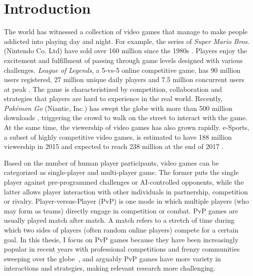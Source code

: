 
\chapter{Introduction} %

\label{chapter:intro} %

The world has witnessed a collection of video games that manage to make people addicted into playing day and night. For example, the series of \textit{Super Mario Bros.} (Nintendo Co. Ltd) have sold over 160 million since the 1980s \cite{mariosale}. Players enjoy the excitement and fulfillment of passing through game levels designed with various challenges. \textit{League of Legends}, a 5-vs-5 online competitive game, has 90 million users registered, 27 million unique daily players and 7.5 million concurrent users at peak \cite{lol_fanbase,lol_27million}. The game is characteristized by competition, collaboration and strategies that players are hard to experience in the real world. Recently, \textit{Pok\'{e}mon Go} (Niantic, Inc.) has swept the globe with more than 500 million downloads \cite{pokemongo}, triggering the crowd to walk on the street to interact with the game. At the same time, the viewership of video games has also grown rapidly. e-Sports, a subset of highly competitive video games, is estimated to have 188 million viewership in 2015 and expected to reach 238 million at the end of 2017 \cite{superdata}. 

Based on the number of human player participants, video games can be categorized as single-player and multi-player game. The former puts the single player against pre-programmed challenges or AI-controlled opponents, while the latter allows player interaction with other individuals in partnership, competition or rivalry. Player-versus-Player (PvP) is one mode in which multiple players (who may form as teams) directly engage in competition or combat. PvP games are usually played match after match. A match refers to a stretch of time during which two sides of players (often random online players) compete for a certain goal. In this thesis, I focus on PvP games because they have been increasingly popular in recent years with professional competitions and frenzy communities sweeping over the globe~\cite{superdata}, and arguably PvP games have more variety in interactions and strategies, making relevant research more challenging. 

